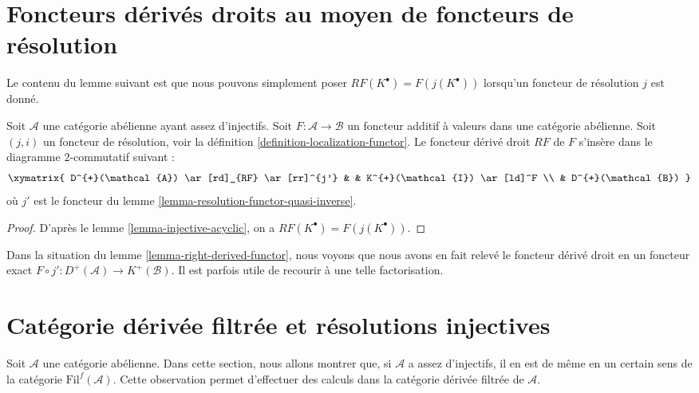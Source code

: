 \section{Foncteurs dérivés droits au moyen de foncteurs de résolution}
\label{section-right-derived-functor-via-resolutions}

\noindent
Le contenu du lemme suivant est que nous pouvons simplement poser
$RF(K^\bullet) = F(j(K^\bullet))$ lorsqu'un foncteur de résolution $j$ est
donné.

\begin{lemma}
\label{lemma-right-derived-functor}
Soit $\mathcal{A}$ une catégorie abélienne ayant assez d'injectifs.
Soit $F : \mathcal{A} \to \mathcal{B}$ un foncteur additif à valeurs dans une
catégorie abélienne. Soit $(j, i)$ un foncteur de résolution, voir la
définition \ref{definition-localization-functor}.
Le foncteur dérivé droit $RF$ de $F$ s'insère dans le diagramme
$2$-commutatif suivant :
$$
\xymatrix{
D^{+}(\mathcal{A}) \ar[rd]_{RF} \ar[rr]^{j'} & &
K^{+}(\mathcal{I}) \ar[ld]^F \\
& D^{+}(\mathcal{B})
}
$$
où $j'$ est le foncteur du
lemme \ref{lemma-resolution-functor-quasi-inverse}.
\end{lemma}

\begin{proof}
D'après le lemme \ref{lemma-injective-acyclic}, on a
$RF(K^\bullet) = F(j(K^\bullet))$.
\end{proof}

\begin{remark}
\label{remark-right-derived-functor}
Dans la situation du lemme \ref{lemma-right-derived-functor}, nous voyons que
nous avons en fait relevé le foncteur dérivé droit en un foncteur exact
$F \circ j' : D^{+}(\mathcal{A}) \to K^{+}(\mathcal{B})$.
Il est parfois utile de recourir à une telle factorisation.
\end{remark}


\section{Catégorie dérivée filtrée et résolutions injectives}
\label{section-filtered-derived}

\noindent
Soit $\mathcal{A}$ une catégorie abélienne. Dans cette section, nous allons
montrer que, si $\mathcal{A}$ a assez d'injectifs, il en est de même en un
certain sens de la catégorie $\text{Fil}^f(\mathcal{A})$. Cette observation
permet d'effectuer des calculs dans la catégorie dérivée filtrée de
$\mathcal{A}$.

